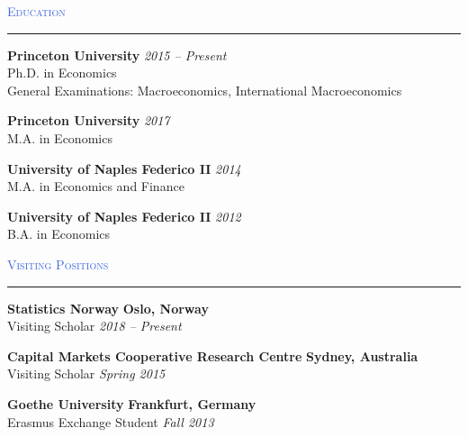 \documentclass{resume} %
\renewenvironment{rSection}[1]{
\sectionskip
\textcolor{RoyalBlue}{\textsc{#1}}
\sectionlineskip
\hrule
\begin{list}{}{
\setlength{\leftmargin}{1.5em}
}
\item[]
}{
\end{list}
}
\begin{document}

\begin{rSection}{Education}


{\bf Princeton University} \hfill {\em 2015 -- Present} 
\\ Ph.D. in Economics \hfill
\\ General Examinations: Macroeconomics, International Macroeconomics \hfill

{\bf Princeton University} \hfill {\em 2017} 
\\ M.A. in Economics \hfill

{\bf University of Naples Federico II} \hfill {\em 2014} 
\\ M.A. in Economics and Finance \hfill

{\bf University of Naples Federico II} \hfill {\em 2012} 
\\ B.A. in Economics \hfill


\end{rSection}


\begin{rSection}{Visiting Positions}

{\bf Statistics Norway} \hfill {\bf Oslo, Norway}
\\ Visiting Scholar \hfill {\em 2018 -- Present}

{\bf Capital Markets Cooperative Research Centre} \hfill {\bf Sydney, Australia}
\\ Visiting Scholar \hfill {\em Spring 2015}

{\bf Goethe University} \hfill {\bf Frankfurt, Germany}
\\ Erasmus Exchange Student \hfill {\em Fall 2013}

\end{rSection}

\end{document}
